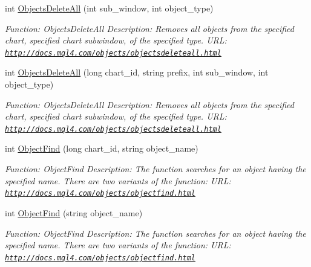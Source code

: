 \begin{DoxyCompactItemize}
int \hyperlink{class_m_q_l4_c_sharp_1_1_base_1_1_m_q_l_base_a1334363d6628b5ef76ac58fda5535d50}{Objects\+Delete\+All} (int sub\+\_\+window, int object\+\_\+type)
\begin{DoxyCompactList}\small\item\em Function\+: Objects\+Delete\+All Description\+: Removes all objects from the specified chart, specified chart subwindow, of the specified type. U\+RL\+: \href{http://docs.mql4.com/objects/objectsdeleteall.html}{\tt http\+://docs.\+mql4.\+com/objects/objectsdeleteall.\+html} \end{DoxyCompactList}\item 
int \hyperlink{class_m_q_l4_c_sharp_1_1_base_1_1_m_q_l_base_a557ab8e01221991e092a7bd9843f568e}{Objects\+Delete\+All} (long chart\+\_\+id, string prefix, int sub\+\_\+window, int object\+\_\+type)
\begin{DoxyCompactList}\small\item\em Function\+: Objects\+Delete\+All Description\+: Removes all objects from the specified chart, specified chart subwindow, of the specified type. U\+RL\+: \href{http://docs.mql4.com/objects/objectsdeleteall.html}{\tt http\+://docs.\+mql4.\+com/objects/objectsdeleteall.\+html} \end{DoxyCompactList}\item 
int \hyperlink{class_m_q_l4_c_sharp_1_1_base_1_1_m_q_l_base_a3b54d60193a86d9f45c6918a74a57f0f}{Object\+Find} (long chart\+\_\+id, string object\+\_\+name)
\begin{DoxyCompactList}\small\item\em Function\+: Object\+Find Description\+: The function searches for an object having the specified name. There are two variants of the function\+: U\+RL\+: \href{http://docs.mql4.com/objects/objectfind.html}{\tt http\+://docs.\+mql4.\+com/objects/objectfind.\+html} \end{DoxyCompactList}\item 
int \hyperlink{class_m_q_l4_c_sharp_1_1_base_1_1_m_q_l_base_ae62c4e7764bd22233907fcdb493afa1a}{Object\+Find} (string object\+\_\+name)
\begin{DoxyCompactList}\small\item\em Function\+: Object\+Find Description\+: The function searches for an object having the specified name. There are two variants of the function\+: U\+RL\+: \href{http://docs.mql4.com/objects/objectfind.html}{\tt http\+://docs.\+mql4.\+com/objects/objectfind.\+html} \end{DoxyCompactList}\item 

\end{DoxyCompactItemize}

